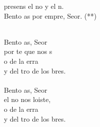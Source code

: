 \begin{cancion}%
	\begin{chorus}%
	 presens el no y el n.\\
	Bento as por empre, Seor. (**)\\
	\end{chorus}%
	\jump\\
	Bento as, Seor\\
	por te  que nos s\\
	o de la erra\\
	y del tro de los bres.\\
	\jump\\
	Bento as, Seor\\
	el no  nos loiste,\\
	o de la erra\\
	y del tro de los bres.\\
\end{cancion}%
